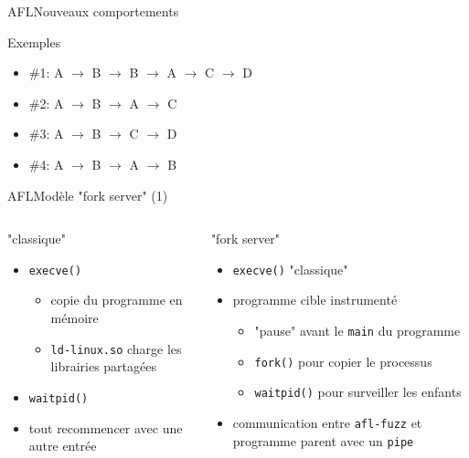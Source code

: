 \begin{frame}{AFL}{Nouveaux comportements}
  {\Large \centerline{Exemples}}

  \hspace{20.5cm}

  \begin{itemize}
    \item{\#1: A $\rightarrow$ B $\rightarrow$ B $\rightarrow$ A $\rightarrow$ C $\rightarrow$ D} \pause
    \item{\#2: A $\rightarrow$ B $\rightarrow$ A $\rightarrow$ C} \pause
    \item{\#3: A $\rightarrow$ B $\rightarrow$ C $\rightarrow$ D} \pause
    \item{\#4: A $\rightarrow$ B $\rightarrow$ A $\rightarrow$ B}
  \end{itemize}
\end{frame}

\begin{frame}{AFL}{Modèle "fork server" (1)}
  \begin{columns}[t]
    \begin{column}{0.49\textwidth}
      \begin{block}{"classique"}
        \begin{itemize}
        \item \lstinline{execve()}
          \begin{itemize}
          \item copie du programme en mémoire
          \item \lstinline{ld-linux.so} charge les librairies partagées
          \end{itemize}
        \item \lstinline{waitpid()}
        \item tout recommencer avec une autre entrée
        \end{itemize}
        \vspace{3.5ex}
      \end{block}
    \end{column}

    \begin{column}{0.49\textwidth}
      \begin{block}{"fork server"}
        \begin{itemize}
        \item \lstinline{execve()} "classique"
        \item programme cible instrumenté
          \begin{itemize}
          \item "pause" avant le \lstinline{main} du programme
          \item \lstinline{fork()} pour copier le processus
          \item \lstinline{waitpid()} pour surveiller les enfants
          \end{itemize}
        \item communication entre \lstinline{afl-fuzz} et programme parent avec un \lstinline{pipe}
        \end{itemize}
      \end{block}
    \end{column}
  \end{columns}
\end{frame}

